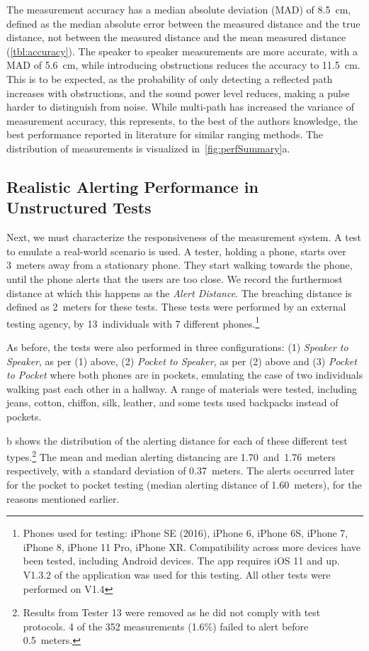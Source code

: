 \documentclass{article}
\begin{document}
The measurement accuracy has a median absolute deviation (MAD) of 8.5~cm, defined as the median absolute error between the measured distance and the true distance, not between the measured distance and the mean measured distance (\cref{tbl:accuracy}). The speaker to speaker measurements are more accurate, with a MAD of 5.6~cm, while introducing obstructions reduces the accuracy to 11.5~cm. This is to be expected, as the probability of only detecting a reflected path increases with obstructions, and the sound power level reduces, making a pulse harder to distinguish from noise. While multi-path has increased the variance of measurement accuracy, this represents, to the best of the authors knowledge, the best performance reported in literature for similar ranging methods. The distribution of measurements is visualized in~\cref{fig:perfSummary}a.


\subsection{Realistic Alerting Performance in Unstructured Tests}

Next, we must characterize the responsiveness of the measurement system. A test to emulate a real-world scenario is used. A tester, holding a phone, starts over 3~meters away from a stationary phone. They start walking towards the phone, until the phone alerts that the users are too close.  We record the furthermost distance at which this happens as the \emph{Alert Distance}. The breaching distance is defined as 2~meters for these tests. These tests were performed by an external testing agency, by 13~individuals with 7 different phones.\footnote{Phones used for testing: iPhone SE (2016), iPhone 6, iPhone 6S, iPhone 7, iPhone 8, iPhone 11 Pro, iPhone XR. Compatibility across more devices have been tested, including Android devices. The app requires iOS 11 and up. V1.3.2 of the application was used for this testing. All other tests were performed on V1.4}

As before, the tests were also performed in three configurations: (1) \emph{Speaker to Speaker}, as per (1) above, (2) \emph{Pocket to Speaker}, as per (2) above and (3) \emph{Pocket to Pocket} where both phones are in pockets, emulating the case of two individuals walking past each other in a hallway.  A range of materials were tested, including jeans, cotton, chiffon, silk, leather, and some tests used backpacks instead of pockets. 

b shows the distribution of the alerting distance for each of these different test types.\footnote{Results from Tester 13 were removed as he did not comply with test protocols. 4 of the 352 measurements (1.6\%) failed to alert before 0.5~meters.}  The mean and median alerting distancing are 1.70~and~1.76~meters respectively, with a standard deviation of 0.37~meters. The alerts occurred later for the pocket to pocket testing (median alerting distance of 1.60~meters), for the reasons mentioned earlier.
    
\end{document}
